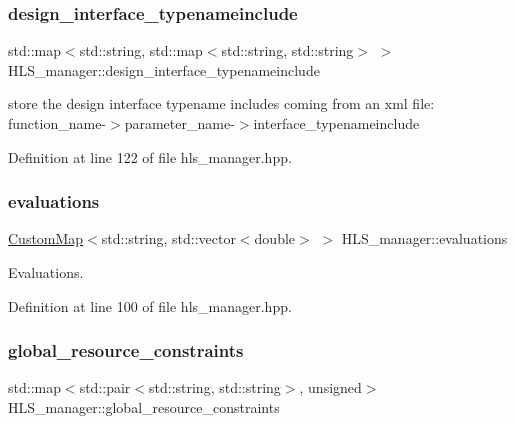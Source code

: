 \subsubsection{\texorpdfstring{design\+\_\+interface\+\_\+typenameinclude}{design\_interface\_typenameinclude}}
{\footnotesize\ttfamily std\+::map$<$std\+::string, std\+::map$<$std\+::string, std\+::string$>$ $>$ H\+L\+S\+\_\+manager\+::design\+\_\+interface\+\_\+typenameinclude}



store the design interface typename includes coming from an xml file\+: function\+\_\+name-\/$>$parameter\+\_\+name-\/$>$interface\+\_\+typenameinclude 



Definition at line 122 of file hls\+\_\+manager.\+hpp.

\mbox{\label{classHLS__manager_a43957c7e13f4ed31cdac9636d20bc638}} 
\subsubsection{\texorpdfstring{evaluations}{evaluations}}
{\footnotesize\ttfamily \hyperlink{custom__map_8hpp_a18ca01763abbe3e5623223bfe5aaac6b}{Custom\+Map}$<$std\+::string, std\+::vector$<$double$>$ $>$ H\+L\+S\+\_\+manager\+::evaluations}



Evaluations. 



Definition at line 100 of file hls\+\_\+manager.\+hpp.

\mbox{\label{classHLS__manager_a72db23fe6f872fbbb85ca81ec4468c0d}} 
\subsubsection{\texorpdfstring{global\+\_\+resource\+\_\+constraints}{global\_resource\_constraints}}
{\footnotesize\ttfamily std\+::map$<$std\+::pair$<$std\+::string, std\+::string$>$, unsigned$>$ H\+L\+S\+\_\+manager\+::global\+\_\+resource\+\_\+constraints}



